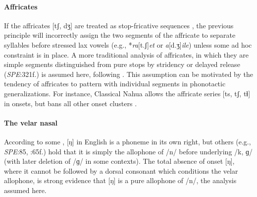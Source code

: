 \paragraph{Affricates} If the affricates [tʃ, dʒ] are treated as stop-fricative sequences \citep[e.g.,][]{Hualde1988,Lombardi1990}, the previous principle will incorrectly assign the two segments of the affricate to separate syllables before stressed lax vowels (e.g., *\emph{ra}[t.ʃ]\emph{et} or \emph{a}[d.ʒ]\emph{ile}) unless some ad hoc constraint \citep[e.g.,][]{Wells1990} is in place. A more traditional analysis of affricates, in which they are simple segments distinguished from pure stops by stridency \citep[24]{Jakobson1961} or delayed release (\emph{SPE}:321f.) is assumed here, following \citeauthor{Pierrehumbert1994}. This assumption can be motivated by the tendency of affricates to pattern with individual segments in phonotactic generalizations. For instance, Classical Nahua allows the affricate series [ts, tʃ, tɬ] in onsets, but bans all other onset clusters \citep[9]{Launey2011}. 

\paragraph{The velar nasal} According to some \citep[e.g.,][]{Sapir1925}, [ŋ] in English is a phoneme in its own right, but others (e.g., \emph{SPE}:85, \citealp{Borowsky1986}:65f.) hold that it is simply the allophone of /n/ before underlying /k, ɡ/ (with later deletion of /ɡ/ in some contexts). The total absence of onset [ŋ], where it cannot be followed by a dorsal consonant which conditions the velar allophone, is strong evidence that [ŋ] is a pure allophone of /n/, the analysis assumed here.

